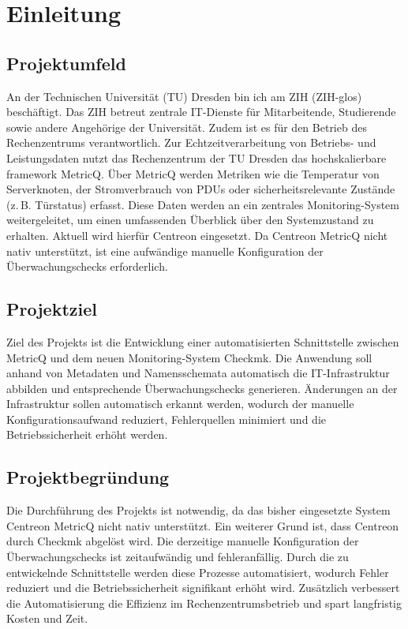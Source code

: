\section{Einleitung}

\subsection{Projektumfeld}
An der Technischen Universität (\acrshort{TU}) Dresden bin ich am \acrlong{ZIH} (\gls{ZIH-glos}) beschäftigt.
Das \acrshort{ZIH} betreut zentrale IT-Dienste für Mitarbeitende, Studierende sowie andere Angehörige der Universität.
Zudem ist es für den Betrieb des Rechenzentrums verantwortlich.
Zur Echtzeitverarbeitung von Betriebs- und Leistungsdaten nutzt das Rechenzentrum der \acrshort{TU} Dresden das hochskalierbare \gls{framework} \gls{MetricQ}.
Über \gls{MetricQ} werden Metriken wie die Temperatur von Serverknoten, der Stromverbrauch von \acrshort{PDU}s oder sicherheitsrelevante Zustände (z.\,B. Türstatus) erfasst.
Diese Daten werden an ein zentrales Monitoring-System weitergeleitet, um einen umfassenden Überblick über den Systemzustand zu erhalten.
Aktuell wird hierfür \gls{Centreon} eingesetzt.
Da \gls{Centreon} \gls{MetricQ} nicht nativ unterstützt, ist eine aufwändige manuelle Konfiguration der Überwachungschecks erforderlich.

\subsection{Projektziel}
Ziel des Projekts ist die Entwicklung einer automatisierten Schnittstelle zwischen \gls{MetricQ} und dem neuen Monitoring-System \gls{Checkmk}.
Die Anwendung soll anhand von Metadaten und Namensschemata automatisch die IT-Infrastruktur abbilden und entsprechende Überwachungschecks generieren.
Änderungen an der Infrastruktur sollen automatisch erkannt werden, wodurch der manuelle Konfigurationsaufwand reduziert, Fehlerquellen minimiert und die Betriebssicherheit erhöht werden.

\subsection{Projektbegründung}
Die Durchführung des Projekts ist notwendig, da das bisher eingesetzte System \gls{Centreon} \gls{MetricQ} nicht nativ unterstützt.
Ein weiterer Grund ist, dass \gls{Centreon} durch \gls{Checkmk} abgelöst wird.
Die derzeitige manuelle Konfiguration der Überwachungschecks ist zeitaufwändig und fehleranfällig.
Durch die zu entwickelnde Schnittstelle werden diese Prozesse automatisiert, wodurch Fehler reduziert und die Betriebssicherheit signifikant erhöht wird.
Zusätzlich verbessert die Automatisierung die Effizienz im Rechenzentrumsbetrieb und spart langfristig Kosten und Zeit.

